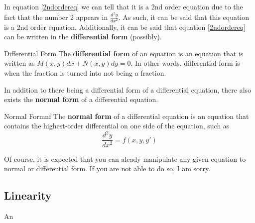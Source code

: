 \documentclass[letter, 11pt]{book}
\begin{document}
In equation \eqref{2ndordereq} we can tell that it is a 2nd order equation due to the fact that the number 2 appears in
$\frac{d^2y}{dx^2}$. As such, it can be said that this equation is a 2nd order equation. 
Additionally, it can be said that equation \eqref{2ndordereq} can be  written in the \textbf{differential form} (possibly).
\begin{definition}{Differential Form}{}
	The \textbf{differential form} of an equation is an equation that is written as $M(x, y)dx + N(x, y)dy = 0$.	
	In other words, differential form is when the fraction is turned into not being a fraction.
\end{definition}

In addition to there being a differential form of a differential equation, there also exists the \textbf{normal form} of a differential equation.
\begin{definition}{Normal Form}{nf}
	The \textbf{normal form} of a differential equation is an equation that contains the highest-order differential on one side
	of the equation, such as
	\begin{equation}
		\frac{d^2y}{dx^2} = f(x, y, y')
	\end{equation}
\end{definition}

Of course, it is expected that you can aleady manipulate any given equation to normal or differential form. If you are
not able to do so, I am sorry.

\subsection{Linearity}
An 
\end{document}

